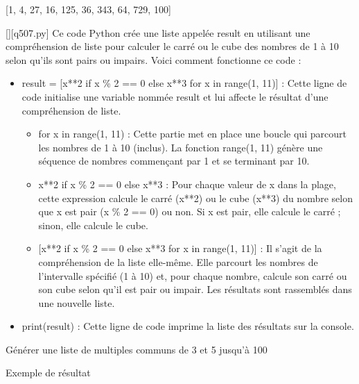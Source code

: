 [1, 4, 27, 16, 125, 36, 343, 64, 729, 100]
        \par
        \begin{solution}
            \renewcommand{\nomfichier}{q507.py}
            \pythonfile{\chemincode \nomfichier}[][\nomfichier]
            Ce code Python crée une liste appelée result en utilisant une compréhension de liste pour calculer le carré ou le cube des nombres de 1 à 10 selon qu'ils sont pairs ou impairs. Voici comment fonctionne ce code :\par

\begin{itemize}
\item     result = [x**2 if x \% 2 == 0 else x**3 for x in range(1, 11)] : Cette ligne de code initialise une variable nommée result et lui affecte le résultat d'une compréhension de liste.

\begin{itemize}
\item         for x in range(1, 11) : Cette partie met en place une boucle qui parcourt les nombres de 1 à 10 (inclus). La fonction range(1, 11) génère une séquence de nombres commençant par 1 et se terminant par 10.
\item         x**2 if x \% 2 == 0 else x**3 : Pour chaque valeur de x dans la plage, cette expression calcule le carré (x**2) ou le cube (x**3) du nombre selon que x est pair (x \% 2 == 0) ou non. Si x est pair, elle calcule le carré ; sinon, elle calcule le cube.
\item{}         [x**2 if x \% 2 == 0 else x**3 for x in range(1, 11)] : Il s'agit de la compréhension de la liste elle-même. Elle parcourt les nombres de l'intervalle spécifié (1 à 10) et, pour chaque nombre, calcule son carré ou son cube selon qu'il est pair ou impair. Les résultats sont rassemblés dans une nouvelle liste.
\end{itemize}
\item    print(result) : Cette ligne de code imprime la liste des résultats sur la console.
\end{itemize}
        \end{solution}
        

        \question
        Générer une liste de multiples communs de 3 et 5 jusqu'à 100

Exemple de résultat

